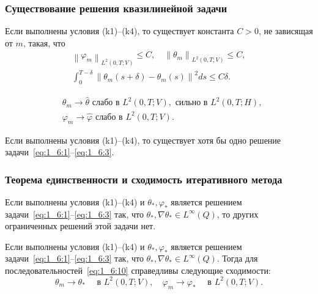 \begin{frame}
    \frametitle{Существование решения квазилинейной задачи}
    \begin{lemma}[1.23]
        \label{lm:1_6:3}
        Если выполнены условия (k1)--(k4), то существует константа $C>0$,
        не зависящая от $m$, такая, что
        \begin{gather*}
            \left\|\varphi_{m}\right\|_{L^{2}(0, T ; V)} \leq C,
            \quad\left\|\theta_{m}\right\|_{L^{2}(0, T ; V)} \leq C, \\
            \int_{0}^{T-\delta}\left\|\theta_{m}(s+\delta)
            -\theta_{m}(s)\right\|^{2} d s \leq C \delta.
        \end{gather*}
    \end{lemma}

    \begin{equation*}
        \begin{aligned}
            & \theta_{m} \rightarrow \widehat{\theta} \text { слабо в } L^{2}(0, T ; V),
            \text { сильно в } L^{2}(0, T ; H), \\
            & \varphi_{m} \rightarrow \widehat{\varphi} \text { слабо в } L^{2}(0, T ; V).
        \end{aligned}
    \end{equation*}

    \begin{theorem}[1.7]
        \label{th:1_6:1}
        Если выполнены условия (k1)--(k4), то существует хотя бы одно
        решение задачи~\eqref{eq:1_6:1}--\eqref{eq:1_6:3}.
    \end{theorem}

\end{frame}

\begin{frame}
    \frametitle{Теорема единственности и сходимость итеративного метода}
    \begin{theorem}[1.8]
        Если выполнены условия (k1)--(k4) и $\theta_{*}, \varphi_{*}$ является
        решением задачи~\eqref{eq:1_6:1}--\eqref{eq:1_6:3}
        так, что $\theta_{*}, \nabla \theta_{*} \in L^{\infty}(Q)$,
        то других ограниченных решений этой задачи нет.
    \end{theorem}


    \begin{theorem}[1.9]
        Если выполнены условия (k1)--(k4) и $\theta_{*}, \varphi_{*}$ является
        решением задачи~\eqref{eq:1_6:1}--\eqref{eq:1_6:3}
        так, что $\theta_{*}, \nabla \theta_{*} \in L^{\infty}(Q)$.
        Тогда для последовательностей~\eqref{eq:1_6:10} справедливы следующие сходимости:
        \[
            \theta_{m} \rightarrow \theta_{*} \quad \text { в } L^{2}(0, T ; V),
            \quad \varphi_{m} \rightarrow \varphi_{*} \quad \text { в } L^{2}(0, T ; V).
        \]
    \end{theorem}

\end{frame}


